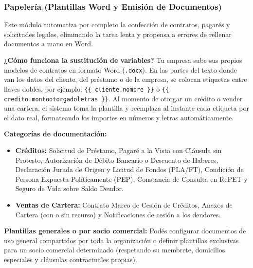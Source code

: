 \documentclass[12pt,a4paper]{article}
\renewcommand{\_}{\textunderscore\allowbreak}
\begin{document}
\subsubsection{Papelería (Plantillas Word y Emisión de Documentos)}
Este módulo automatiza por completo la confección de contratos, pagarés y solicitudes legales, eliminando la tarea lenta y propensa a errores de rellenar documentos a mano en Word.

\textbf{¿Cómo funciona la sustitución de variables?}
Tu empresa sube sus propios modelos de contratos en formato Word (\texttt{.docx}). En las partes del texto donde van los datos del cliente, del préstamo o de la empresa, se colocan etiquetas entre llaves dobles, por ejemplo: \texttt{\{\{ cliente.nombre \}\}} o \texttt{\{\{ credito.monto\_otorgado\_letras \}\}}.
Al momento de otorgar un crédito o vender una cartera, el sistema toma la plantilla y reemplaza al instante cada etiqueta por el dato real, formateando los importes en números y letras automáticamente.

\textbf{Categorías de documentación:}
\begin{itemize}
    \item \textbf{Créditos:} Solicitud de Préstamo, Pagaré a la Vista con Cláusula sin Protesto, Autorización de Débito Bancario o Descuento de Haberes, Declaración Jurada de Origen y Licitud de Fondos (PLA/FT), Condición de Persona Expuesta Políticamente (PEP), Constancia de Consulta en RePET y Seguro de Vida sobre Saldo Deudor.
    \item \textbf{Ventas de Cartera:} Contrato Marco de Cesión de Créditos, Anexos de Cartera (con o sin recurso) y Notificaciones de cesión a los deudores.
\end{itemize}

\textbf{Plantillas generales o por socio comercial:}
Podés configurar documentos de uso general compartidos por toda la organización o definir plantillas exclusivas para un socio comercial determinado (respetando su membrete, domicilios especiales y cláusulas contractuales propias).
\end{document}
